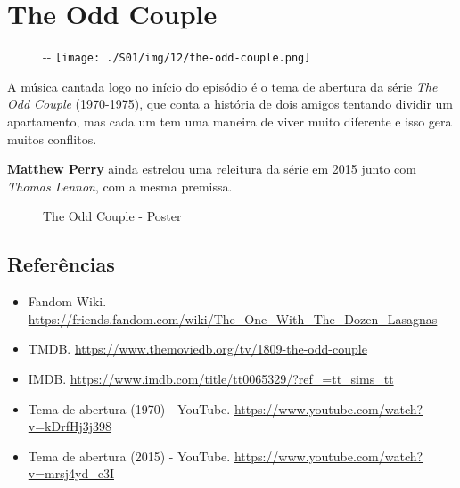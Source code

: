 \hypertarget{the-odd-couple}{%
\section{The Odd Couple}\label{the-odd-couple}}

\begin{figure}[!ht]
  \begin{adjustwidth}{-\oddsidemargin-1in}{-\rightmargin}
    \centering
    \texttt{[image: ./S01/img/12/the-odd-couple.png]}
  \end{adjustwidth}
\end{figure}

A música cantada logo no início do episódio é o tema de abertura da
série \emph{The Odd Couple} (1970-1975), que conta a história de dois
amigos tentando dividir um apartamento, mas cada um tem uma maneira de
viver muito diferente e isso gera muitos conflitos.

\textbf{Matthew Perry} ainda estrelou uma releitura da série em 2015
junto com \emph{Thomas Lennon}, com a mesma premissa.

\begin{figure}
  \centering
    \caption{The Odd Couple - Poster\label{fig:the-odd-couple-poster}}
\end{figure}

\hypertarget{referuxeancias}{%
\subsection{Referências}\label{referuxeancias}}

\begin{itemize}
\tightlist
\item
  \sloppy Fandom Wiki. \url{https://friends.fandom.com/wiki/The_One_With_The_Dozen_Lasagnas}
\item
  \sloppy TMDB. \url{https://www.themoviedb.org/tv/1809-the-odd-couple}
\item
  \sloppy IMDB. \url{https://www.imdb.com/title/tt0065329/?ref_=tt_sims_tt}
\item
  \sloppy Tema de abertura (1970) - YouTube. \url{https://www.youtube.com/watch?v=kDrfHj3j398}
\item
  \sloppy Tema de abertura (2015) - YouTube. \url{https://www.youtube.com/watch?v=mrsj4yd_c3I}
\end{itemize}

